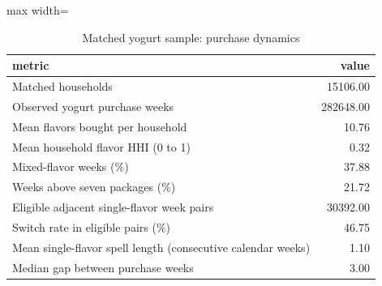 \begin{table}[htbp]\centering\small
\caption{Matched yogurt sample: purchase dynamics}
\begin{adjustbox}{max width=\linewidth}
\begin{tabular}{lr}
\toprule
metric & value \\
\midrule
Matched households & 15106.00 \\
Observed yogurt purchase weeks & 282648.00 \\
Mean flavors bought per household & 10.76 \\
Mean household flavor HHI (0 to 1) & 0.32 \\
Mixed-flavor weeks (\%) & 37.88 \\
Weeks above seven packages (\%) & 21.72 \\
Eligible adjacent single-flavor week pairs & 30392.00 \\
Switch rate in eligible pairs (\%) & 46.75 \\
Mean single-flavor spell length (consecutive calendar weeks) & 1.10 \\
Median gap between purchase weeks & 3.00 \\
\bottomrule
\end{tabular}
\end{adjustbox}
\end{table}

